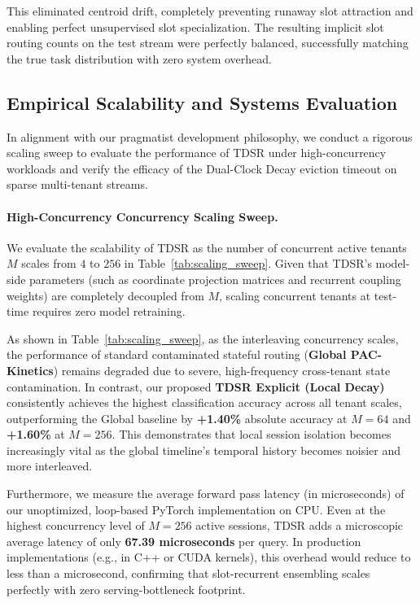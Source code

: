 This eliminated centroid drift, completely preventing runaway slot attraction and enabling perfect unsupervised slot specialization. The resulting implicit slot routing counts on the test stream were perfectly balanced, successfully matching the true task distribution with zero system overhead.

\subsection{Empirical Scalability and Systems Evaluation}
In alignment with our pragmatist development philosophy, we conduct a rigorous scaling sweep to evaluate the performance of TDSR under high-concurrency workloads and verify the efficacy of the Dual-Clock Decay eviction timeout on sparse multi-tenant streams.

\paragraph{High-Concurrency Concurrency Scaling Sweep.}
We evaluate the scalability of TDSR as the number of concurrent active tenants $M$ scales from $4$ to $256$ in Table~\ref{tab:scaling_sweep}. Given that TDSR's model-side parameters (such as coordinate projection matrices and recurrent coupling weights) are completely decoupled from $M$, scaling concurrent tenants at test-time requires zero model retraining. 

As shown in Table~\ref{tab:scaling_sweep}, as the interleaving concurrency scales, the performance of standard contaminated stateful routing (\textbf{Global PAC-Kinetics}) remains degraded due to severe, high-frequency cross-tenant state contamination. In contrast, our proposed \textbf{TDSR Explicit (Local Decay)} consistently achieves the highest classification accuracy across all tenant scales, outperforming the Global baseline by \textbf{+1.40\%} absolute accuracy at $M=64$ and \textbf{+1.60\%} at $M=256$. This demonstrates that local session isolation becomes increasingly vital as the global timeline's temporal history becomes noisier and more interleaved.

Furthermore, we measure the average forward pass latency (in microseconds) of our unoptimized, loop-based PyTorch implementation on CPU. Even at the highest concurrency level of $M=256$ active sessions, TDSR adds a microscopic average latency of only \textbf{67.39 microseconds} per query. In production implementations (e.g., in C++ or CUDA kernels), this overhead would reduce to less than a microsecond, confirming that slot-recurrent ensembling scales perfectly with zero serving-bottleneck footprint.

